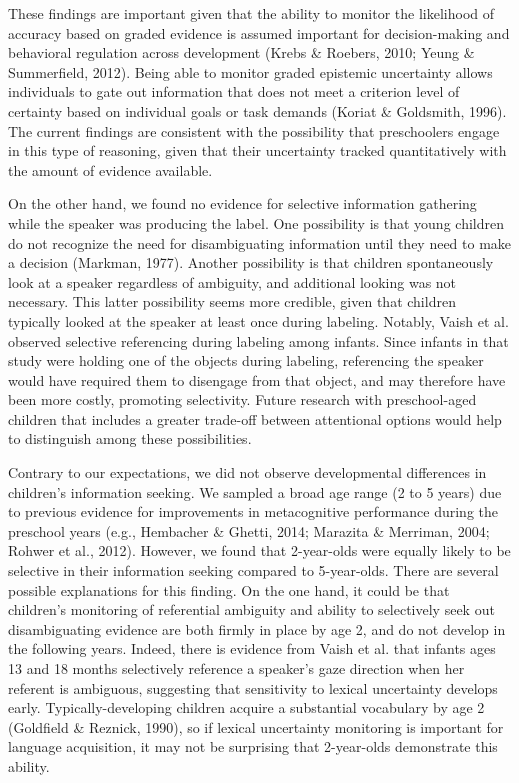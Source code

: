 \documentclass[english,,man]{apa6}
\begin{document}
These findings are important given that the ability to monitor the
likelihood of accuracy based on graded evidence is assumed important for
decision-making and behavioral regulation across development (Krebs \&
Roebers, 2010; Yeung \& Summerfield, 2012). Being able to monitor graded
epistemic uncertainty allows individuals to gate out information that
does not meet a criterion level of certainty based on individual goals
or task demands (Koriat \& Goldsmith, 1996). The current findings are
consistent with the possibility that preschoolers engage in this type of
reasoning, given that their uncertainty tracked quantitatively with the
amount of evidence available.

On the other hand, we found no evidence for selective information
gathering while the speaker was producing the label. One possibility is
that young children do not recognize the need for disambiguating
information until they need to make a decision (Markman, 1977). Another
possibility is that children spontaneously look at a speaker regardless
of ambiguity, and additional looking was not necessary. This latter
possibility seems more credible, given that children typically looked at
the speaker at least once during labeling. Notably, Vaish et al.
observed selective referencing during labeling among infants. Since
infants in that study were holding one of the objects during labeling,
referencing the speaker would have required them to disengage from that
object, and may therefore have been more costly, promoting selectivity.
Future research with preschool-aged children that includes a greater
trade-off between attentional options would help to distinguish among
these possibilities.

Contrary to our expectations, we did not observe developmental
differences in children's information seeking. We sampled a broad age
range (2 to 5 years) due to previous evidence for improvements in
metacognitive performance during the preschool years (e.g., Hembacher \&
Ghetti, 2014; Marazita \& Merriman, 2004; Rohwer et al., 2012). However,
we found that 2-year-olds were equally likely to be selective in their
information seeking compared to 5-year-olds. There are several possible
explanations for this finding. On the one hand, it could be that
children's monitoring of referential ambiguity and ability to
selectively seek out disambiguating evidence are both firmly in place by
age 2, and do not develop in the following years. Indeed, there is
evidence from Vaish et al. that infants ages 13 and 18 months
selectively reference a speaker's gaze direction when her referent is
ambiguous, suggesting that sensitivity to lexical uncertainty develops
early. Typically-developing children acquire a substantial vocabulary by
age 2 (Goldfield \& Reznick, 1990), so if lexical uncertainty monitoring
is important for language acquisition, it may not be surprising that
2-year-olds demonstrate this ability.
\end{document}
